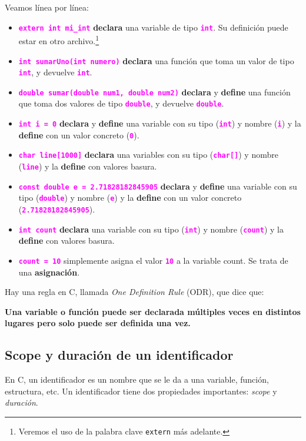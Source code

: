 \documentclass[]{scrartcl}
\newcommand{\hl}[1]{\textcolor{magenta}{\textbf{\texttt{#1}}}}
\begin{document}
Veamos línea por línea:
\begin{itemize}
  \item \hl{extern int mi\_int} \textbf{declara} una variable de tipo \hl{int}. Su definición puede estar en otro archivo.\footnote{Veremos el uso de la palabra clave \texttt{extern} más adelante.}
  \item \hl{int sumarUno(int numero)} \textbf{declara} una función que toma un valor de tipo \hl{int}, y devuelve \hl{int}.
  \item \hl{double sumar(double num1, double num2)} \textbf{declara} y \textbf{define} una función que toma dos valores de tipo \hl{double}, y devuelve \hl{double}.
  \item \hl{int i = 0} \textbf{declara} y \textbf{define} una variable con su tipo (\hl{int}) y nombre (\hl{i}) y la \textbf{define} con un valor concreto (\hl{0}). 
  \item \hl{char line[1000]} \textbf{declara} una variables con su tipo (\hl{char[]}) y nombre (\hl{line}) y la \textbf{define} con valores basura. 
  \item \hl{const double e = 2.71828182845905} \textbf{declara} y \textbf{define} una variable con su tipo (\hl{double}) y nombre (\hl{e}) y la \textbf{define} con un valor concreto (\hl{2.71828182845905}).
  \item \hl{int count} \textbf{declara} una variable con su tipo (\hl{int}) y nombre (\hl{count}) y la \textbf{define} con valores basura.
  \item \hl{count = 10} simplemente asigna el valor \hl{10} a la variable count. Se trata de una \textbf{asignación}. 
\end{itemize}

Hay una regla en C, llamada \textit{One Definition Rule} (ODR), que dice que:

\begin{importantbox}
  \centering
  \textbf{Una variable o función puede ser declarada múltiples veces en distintos lugares pero solo puede ser definida una vez.}
\end{importantbox}

\subsection*{Scope y duración de un identificador}

En C, un identificador es un nombre que se le da a una variable, función, estructura, etc. Un identificador tiene dos propiedades importantes: \textit{scope} y \textit{duración}.
\end{document}
